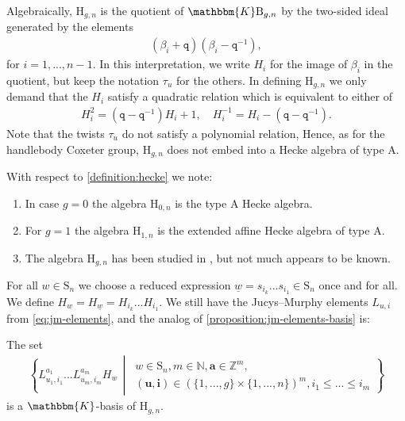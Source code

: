\documentclass[a4paper,11pt]{amsart}
\renewcommand{\dots}{\text{...}}
\newcommand{\setstuff}[1]{\mathrm{#1}}
\newcommand{\Z}{\mathbb{Z}}
\newcommand{\KK}{\mathbbm{K}}
\newcommand{\N}{\mathbb{N}}
\newcommand{\bsym}[1]{\boldsymbol{#1}}
\newcommand{\varsym}[1]{\mathtt{#1}}
\newcommand{\jm}{L}
\newcommand{\qvar}{\varsym{q}}
\numberwithin{equation}{section}
\let\fullref\autoref
\begin{document}
Algebraically, 
$\setstuff{H}_{g,n}$ is the quotient 
of $\KK\setstuff{B}_{g,n}$ by the two-sided ideal generated by the elements
\begin{gather*}
(\beta_{i}+\qvar)(\beta_{i}-\qvar^{-1}), 
\end{gather*}
for $i=1,\dots,n-1$.
In this interpretation, we write $H_{i}$ for the image of 
$\beta_{i}$ in the quotient, but keep the notation $\tau_{u}$ for the others.
In defining $\setstuff{H}_{g,n}$ we only demand that
the $H_{i}$ satisfy a quadratic relation which 
is equivalent to either of
\begin{gather*}
H_{i}^{2}=(\qvar-\qvar^{-1})H_{i}+1,
\quad
H_{i}^{-1}=H_{i}-(\qvar-\qvar^{-1}).
\end{gather*}
Note that the twists $\tau_{u}$ do not satisfy 
a polynomial relation, Hence, as for the handlebody Coxeter group, 
$\setstuff{H}_{g,n}$ does not embed into 
a Hecke algebra of type A.

\begin{remark}\label{remark:hecke}
With respect to \fullref{definition:hecke} we note:	
\begin{enumerate}

\item In case $g=0$ the algebra $\setstuff{H}_{0,n}$ is the type A Hecke algebra.

\item For $g=1$ the algebra $\setstuff{H}_{1,n}$ is the extended affine Hecke algebra of type A. 

\item The algebra $\setstuff{H}_{g,n}$  
has been studied in \cite{Ba-braid-handlebodies}, 
but not much appears to be known.
\end{enumerate}
\end{remark}

For all $w\in\setstuff{S}_{n}$ we choose a 
reduced expression $\underline{w}=s_{i_{k}}\dots 
s_{i_{1}}\in\setstuff{S}_{n}$ 
once and for all. We define $H_{w}=H_{\underline{w}}=H_{i_{k}}\dots H_{i_{1}}$. 
We still have the Jucys--Murphy elements $\jm_{u,i}$ 
from \eqref{eq:jm-elements}, and the analog of \fullref{proposition:jm-elements-basis} is:

\begin{proposition}\label{proposition:heckejm-elements-basis}
The set
\begin{gather}\label{eq:jm-basis-hecke1}
\left\{ 
\jm_{u_{1},i_{1}}^{a_{1}}\dots 
\jm_{u_{m},i_{m}}^{a_{m}}H_{w} 
\,\middle\vert\,
\begin{gathered}
w\in\setstuff{S}_{n},
m\in\N,
\bsym{a}\in\Z^{m},
\\
(\bsym{u},\bsym{i})\in(\{1,\dots,g\}\times\{1,\dots,n\})^{m},
i_{1}\leq\dots\leq i_{m}
\end{gathered}
\right\}
\end{gather}
is a $\KK$-basis of $\setstuff{H}_{g,n}$.
\end{proposition}
\end{document}
